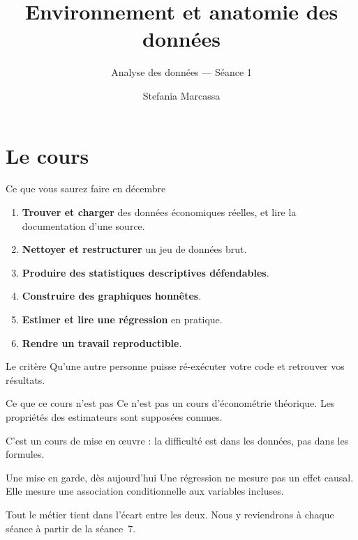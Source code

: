 \documentclass[10pt,aspectratio=169]{beamer}
\title{Environnement et anatomie des données}
\subtitle{Analyse des données --- Séance 1}
\author{Stefania Marcassa}
\institute{CY Cergy Paris Université --- L3 Économie}
\date{}
\begin{document}
\maketitle

\section{Le cours}

\begin{frame}{Ce que vous saurez faire en décembre}
\begin{enumerate}
  \item \textbf{Trouver et charger} des données économiques réelles, et lire la documentation d'une source.
  \item \textbf{Nettoyer et restructurer} un jeu de données brut.
  \item \textbf{Produire des statistiques descriptives défendables}.
  \item \textbf{Construire des graphiques honnêtes}.
  \item \textbf{Estimer et lire une régression} en pratique.
  \item \textbf{Rendre un travail reproductible}.
\end{enumerate}
\vfill
\begin{alertblock}{Le critère}
Qu'une autre personne puisse ré-exécuter votre code et retrouver vos résultats.
\end{alertblock}
\end{frame}

\begin{frame}{Ce que ce cours n'est pas}
Ce n'est pas un cours d'économétrie théorique. Les propriétés des estimateurs sont supposées connues.

\vspace{1em}
C'est un cours de \alert{mise en œuvre} : la difficulté est dans les données, pas dans les formules.

\vspace{1.5em}
\begin{block}{Une mise en garde, dès aujourd'hui}
Une régression ne mesure pas un effet causal. Elle mesure une association conditionnelle aux variables incluses.

\vspace{0.4em}
Tout le métier tient dans l'écart entre les deux. Nous y reviendrons à chaque séance à partir de la séance~7.
\end{block}
\end{frame}
\end{document}
